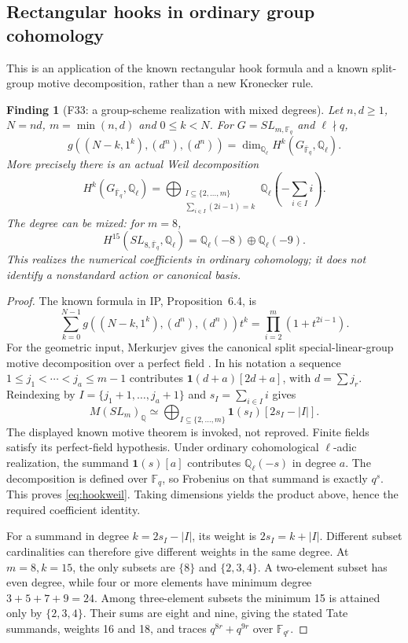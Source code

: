 \documentclass[11pt,a4paper]{article}
\newcommand{\Q}{\mathbb Q}\newcommand{\Z}{\mathbb Z}\newcommand{\C}{\mathbb C}\newcommand{\N}{\mathbb N}\newcommand{\F}{\mathbb F}
\renewcommand{\S}{\ensuremath{\mathsection}}
\newcommand{\fid}[1]{\textsf{#1}}\newcommand{\gate}[1]{\textsf{#1}}
\theoremstyle{named}\newtheorem{finding}{Finding}[section]
\theoremstyle{definition}\newtheorem{definition}[finding]{Definition}
\theoremstyle{remark}\newtheorem{remark}[finding]{Remark}
\begin{document}
\subsection{Rectangular hooks in ordinary group cohomology}
This is an application of the known rectangular hook formula and
a known split-group motive decomposition, rather than a new
Kronecker rule.

\begin{finding}[\fid{F33}: a group-scheme realization with mixed degrees]\label{f:hookgeometry}
Let $n,d\ge1$, $N=nd$, $m=\min(n,d)$ and $0\le k<N$.
For $G=SL_{m,\F_q}$ and $\ell\nmid q$,
\[
 g((N-k,1^k),(d^n),(d^n))
   =\dim_{\Q_\ell}H^k(G_{\bar{\F}_q},\Q_\ell).
\]
More precisely there is an actual Weil decomposition
\begin{equation}\label{eq:hookweil}
 H^k(G_{\bar{\F}_q},\Q_\ell)=
 \bigoplus_{\substack{I\subseteq\{2,\ldots,m\}\\
                     \sum_{i\in I}(2i-1)=k}}
       \Q_\ell\left(-\sum_{i\in I}i\right).
\end{equation}
The degree can be mixed: for $m=8$,
\[
 H^{15}(SL_{8,\bar{\F}_q},\Q_\ell)
       =\Q_\ell(-8)\oplus\Q_\ell(-9).
\]
This realizes the numerical coefficients in ordinary cohomology;
it does not identify a nonstandard action or canonical basis.
\end{finding}

\begin{proof}
The known formula in IP, Proposition~6.4, is
\[
 \sum_{k=0}^{N-1}g((N-k,1^k),(d^n),(d^n))t^k
       =\prod_{i=2}^m(1+t^{2i-1}).
\]
For the geometric input, Merkurjev gives the canonical split
special-linear-group motive decomposition over a perfect field
\cite[\S5, Corollary~5.5, p.~8; notation on p.~7]{MerkurjevSL}.
In his notation a sequence
$1\le j_1<\cdots<j_a\le m-1$ contributes
$\mathbf1(d+a)[2d+a]$, with $d=\sum j_r$.
Reindexing by $I=\{j_1+1,\ldots,j_a+1\}$ and
$s_I=\sum_{i\in I}i$ gives
\[
 M(SL_m)_{\Q}
       \simeq\bigoplus_{I\subseteq\{2,\ldots,m\}}
                 \mathbf1(s_I)[2s_I-|I|].
\]
The displayed known motive theorem is invoked, not reproved.
Finite fields satisfy its perfect-field hypothesis.
Under ordinary cohomological $\ell$-adic realization, the summand
$\mathbf1(s)[a]$ contributes $\Q_\ell(-s)$ in degree $a$.
The decomposition is defined over $\F_q$, so Frobenius on that
summand is exactly $q^s$. This proves \eqref{eq:hookweil}.
Taking dimensions yields the product above, hence the required
coefficient identity.

For a summand in degree $k=2s_I-|I|$, its weight is
$2s_I=k+|I|$. Different subset cardinalities can therefore give
different weights in the same degree. At $m=8,k=15$, the only
subsets are $\{8\}$ and $\{2,3,4\}$. A two-element subset has
even degree, while four or more elements have minimum degree
$3+5+7+9=24$. Among three-element subsets the minimum 15 is
attained only by $\{2,3,4\}$. Their sums are eight and nine,
giving the stated Tate summands, weights 16 and 18, and traces
$q^{8r}+q^{9r}$ over $\F_{q^r}$.
\end{proof}
\end{document}

